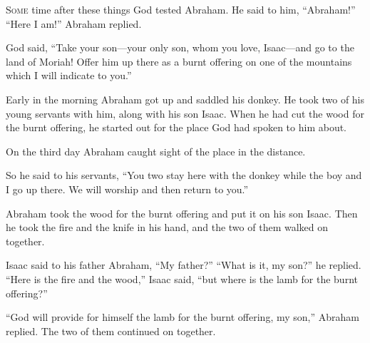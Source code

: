 \begin{scripture}
 \allowchapbreak\hypertarget{ch-genesis-22}{}\lettrine[lines=5]{\color{pentateuch}S}{\textsc{ome}} time after these things God tested Abraham. He said to him, ``Abraham!'' ``Here I am!'' Abraham replied.\everypar{}
 God said, ``Take your son---your only son, whom you love, Isaac---and go to the land of Moriah! Offer him up there as a burnt offering on one of the mountains which I will indicate to you.''
\everypar{}

 Early in the morning Abraham got up and saddled his donkey. He took two of his young servants with him, along with his son Isaac. When he had cut the wood for the burnt offering, he started out for the place God had spoken to him about.
\everypar{}

 On the third day Abraham caught sight of the place in the distance.
 So he said to his servants, ``You two stay here with the donkey while the boy and I go up there. We will worship and then return to you.''
\everypar{}

 Abraham took the wood for the burnt offering and put it on his son Isaac. Then he took the fire and the knife in his hand, and the two of them walked on together.
 Isaac said to his father Abraham, ``My father?'' ``What is it, my son?'' he replied. ``Here is the fire and the wood,'' Isaac said, ``but where is the lamb for the burnt offering?''
 ``God will provide for himself the lamb for the burnt offering, my son,'' Abraham replied. The two of them continued on together.
\everypar{}


\end{scripture}
